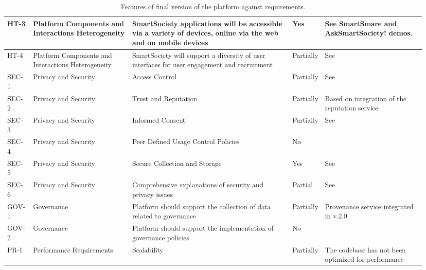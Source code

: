 \begin{sidewaystable}
{\begin{tabular}{|p{1.1cm}|p{4cm}|p{6.7cm}|p{1.5cm}|p{6.2cm}|}
HT-3  & Platform Components and Interactions Heterogeneity & SmartSociety applications will be accessible via a variety of devices, online via the web and on mobile devices & Yes & See SmartSmare and AskSmartSociety! demos.\\ \hline
HT-4  & Platform Components and Interactions Heterogeneity & SmartSociety  will support a diversity of user interfaces for user engagement and recruitment & Partially & See~\cite{D9.3}\\ \hline
SEC-1 & Privacy and Security & Access Control & Partially & See~\cite{D4.3}\\  \hline
SEC-2 &  Privacy and Security & Trust and Reputation & Partially & Based on integration of the reputation service \\ \hline
SEC-3 &  Privacy and Security & Informed Consent & Partially & See~\cite{D4.3}\\ \hline
SEC-4 &  Privacy and Security & Peer Defined Usage Control Policies & No & \\ \hline
SEC-5 &  Privacy and Security & Secure Collection and Storage & Yes & See~\cite{D4.3}\\ \hline
SEC-6 &  Privacy and Security & Comprehensive explanations of security and privacy issues & Partial & See~\cite{D1.2}\\ \hline
GOV-1 & Governance & Platform should support the collection of data related to governance & Partially & Provenance service integrated in v.2.0\\ \hline
GOV-2 & Governance  & Platform should support the implementation of governance policies & No & \\ \hline
PR-1 & Performance Requirements & Scalability & Partially & The codebase has not been optimized for performance\\ \hline
\end{tabular}
}
\caption{Features of final version of the platform against requirements.}
\label{tab:req}
\end{sidewaystable}

